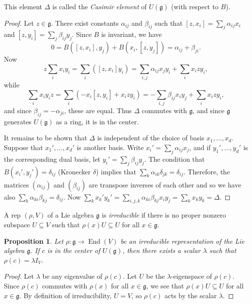 \documentclass[12pt,reqno]{book}%
\newtheorem{proposition}{Proposition}[chapter]
\theoremstyle{definition}
\theoremstyle{remark}
\theoremstyle{theorem}
\theoremstyle{remark}
\DeclareMathOperator{\End}{End}
\begin{document}
This element $\Delta$ is called the \emph{Casimir element} of $U(\mathfrak{g})$ (with respect to $B$).

\begin{proof}%
    Let $z \in \mathfrak{g}$.
    There exist constants $\alpha_{ij}$ and $\beta_{ij}$ such that $[z, x_i] = \sum_{j} \alpha_{ij} x_i$ and $[z, y_i] = \sum_{j} \beta_{ij} y_j$.
    Since $B$ is invariant, we have
    \[
        0 = B([z, x_i], y_j) + B(x_i, [z, y_j]) = \alpha_{ij} + \beta_{ji}.
    \]
    Now
    \[
        z \sum_{i} x_iy_i = \sum_{i} ([z, x_i]y_i) = \sum_{i, j} \alpha_{ij} x_j y_i + \sum_{i} x_izy_i,
    \]
    while
    \[
        \sum_{i} x_iy_iz = \sum_{i} (-x_i[z, y_i] + x_izy_i) = - \sum_{i, j} \beta_{ij} x_i y_j + \sum_{i} x_i z y_i,
    \]
    and since $\beta_{ij} = - \alpha_{ji}$, these are equal.
    Thus $\Delta$ commutes with $\mathfrak{g}$, and since $\mathfrak{g}$ generates $U(\mathfrak{g})$ as a ring, it is in the center.

    It remains to be shown that $\Delta$ is independent of the choice of basis $x_1, \ldots, x_d$.
    Suppose that $x_1', \ldots, x_d'$ is another basis.
    Write $x_i' = \sum_{j} \alpha_{ij} x_j$, and if $y_1', \ldots, y_d'$ is the corresponding dual basis, let $y_i' = \sum_{j} \beta_{ij} y_j$.
    The condition that $B(x_i', y_j') = \delta_{ij}$ (Kronecker $\delta$) implies that $\sum_{k} \alpha_{ik} \delta_{jk} = \delta_{ij}$.
    Therefore, the matrices $(\alpha_{ij})$ and $(\beta_{ij})$ are transpose inverses of each other and so we have also $\sum_{k} \alpha_{ki} \beta_{kj} = \delta_{ij}$.
    Now $\sum_{k} x_k' y_k' = \sum_{i, j, k} \alpha_{ki} \beta_{kj} x_i y_j = \sum_{k} x_k y_k = \Delta$.
\end{proof}%

A rep $(\rho, V)$ of a Lie algebra $\mathfrak{g}$ is \emph{irreducible} if there is no proper nonzero subspace $U \subseteq V$ such that $\rho(x)U \subseteq U$ for all $x \in \mathfrak{g}$.

\begin{proposition}\label{10.4}%
    Let $\rho : \mathfrak{g} \to \End(V)$ be an irreducible representation of the Lie algebra $\mathfrak{g}$.
If $c$ is in the center of $U(\mathfrak{g})$, then there exists a scalar $\lambda$ such that $\rho(c) = \lambda I_V$.
\end{proposition}%
\begin{proof}%
    Let $\lambda$ be any eigenvalue of $\rho(c)$.
    Let $U$ be the $\lambda$-eigenspace of $\rho(c)$.
    Since $\rho(c)$ commutes with $\rho(x)$ for all $x \in \mathfrak{g}$, we see that $\rho(x)U \subseteq U$ for all $x \in \mathfrak{g}$.
    By definition of irreducibility, $U = V$, so $\rho(c)$ acts by the scalar $\lambda$.
\end{proof}%
\end{document}
